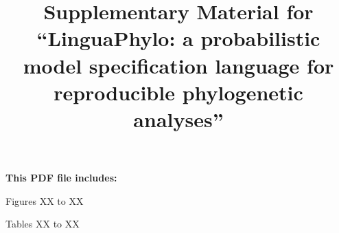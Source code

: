 \documentclass[12pt]{article} %
\begin{document}
\title{Supplementary Material for ``LinguaPhylo: a probabilistic model specification language for reproducible phylogenetic analyses''}

\date{}

\maketitle 


\bigskip

\textbf{This PDF file includes:}

\medskip 

Figures XX to XX

\medskip

Tables XX to XX

\newpage 

\begingroup
\pagestyle{plain}
\listoffigures
\listoftables
\endgroup

\newpage

\end{document}

